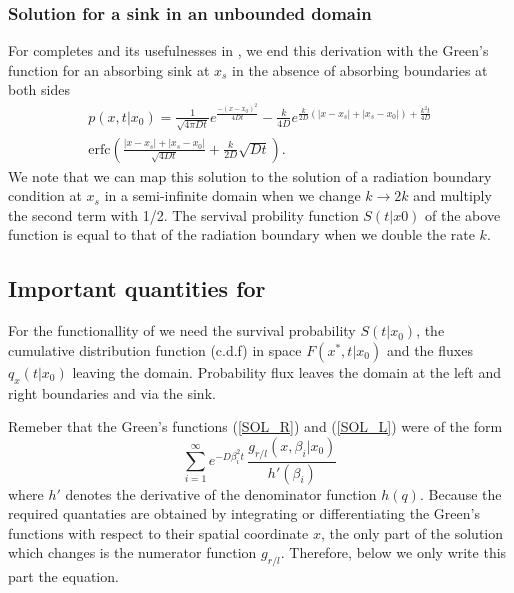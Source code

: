 \subsubsection{Solution for a sink in an unbounded domain}

For completes and its usefulnesses in \GFRD, we end this derivation with the Green's function for an absorbing sink at $x_s$ in the absence of absorbing boundaries at both sides
\begin{multline}
 p(x,t|x_0) = \frac{1}{\sqrt{4 \pi D t}}e^{\frac{-(x-x_0)^2}{4 D t}} - \frac{k}{4 D}e^{\frac{k}{2 D}(|x-x_s|+|x_s-x_0|)+\frac{k^2 t}{4 D}} \\
\mathrm{erfc}\left( \frac{|x-x_s|+|x_s-x_0|}{\sqrt{4 D t}}+\frac{k}{2D}\sqrt{D t} \right).
\label{FSOL_NB}
\end{multline}
We note that we can map this solution to the solution of a radiation boundary condition at $x_s$ in a semi-infinite domain when we change $k \rightarrow 2 k$ and multiply the second term with 1/2. The servival probility function $S(t|x0)$ of the above function is equal to that of the radiation boundary when we double the rate $k$.

\subsection{Important quantities for \GFRD}

For the functionallity of \GFRD we need the survival probability $S(t|x_0)$, the cumulative distribution function (c.d.f) in space $F(x^*,t|x_0)$ and the fluxes $q_x(t|x_0)$ leaving the domain. Probability flux leaves the domain at the left and right boundaries and via the sink.

Remeber that the Green's functions (\ref{SOL_R}) and (\ref{SOL_L}) were of the form
\begin{equation} 
 \sum_{i=1}^{\infty} e^{-D \beta_i ^2 t} \, \frac{g_{r/l}(x, \beta_i |x_0)}{ h'(\beta_i)}
\end{equation}
where $h'$ denotes the derivative of the denominator function $h(q)$. Because the required quantaties are obtained by integrating or differentiating the Green's functions with respect to their spatial coordinate $x$, the only part of the solution which changes is the numerator function $g_{r/l}$. Therefore, below we only write this part the equation.

